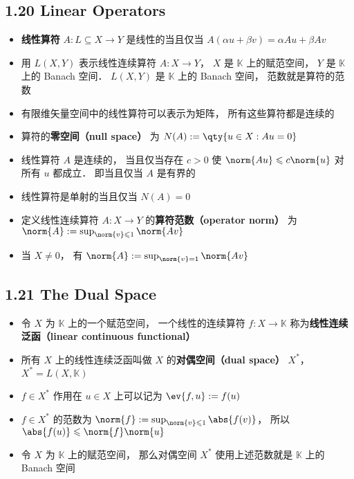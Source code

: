 \subsection{1.20 Linear Operators}
\begin{itemize}
\item \textbf{线性算符} $A: L \subseteq X\to Y$ 是线性的当且仅当 $A (\alpha u + \beta v) = \alpha Au + \beta Av$

\item 用 $L(X, Y)$ 表示线性连续算符 $A: X \to Y$， $X$ 是 $\mathbb K$ 上的赋范空间， $Y$ 是 $\mathbb K$ 上的 Banach 空间． $L(X, Y)$ 是 $\mathbb K$ 上的 Banach 空间， 范数就是算符的范数

\item 有限维矢量空间中的线性算符可以表示为矩阵， 所有这些算符都是连续的

\item 算符的\textbf{零空间（null space）} 为 $N(A) := \qty{u \in X: Au = 0}$

\item 线性算符 $A$ 是连续的， 当且仅当存在 $c > 0$ 使 $\norm{Au} \leqslant c\norm{u}$ 对所有 $u$ 都成立． 即当且仅当 $A$ 是有界的

\item 线性算符是单射的当且仅当 $N(A) = {0}$

\item 定义线性连续算符 $A: X \to Y$ 的\textbf{算符范数（operator norm）} 为 $\norm{A} := \sup_{\norm{v} \leqslant 1} \norm{A v}$

\item 当 $X \ne {0}$， 有 $\norm{A} := \sup_{\norm{v} = 1} \norm{A v}$
\end{itemize}

\subsection{1.21 The Dual Space}

\begin{itemize}
\item 令 $X$ 为 $\mathbb K$ 上的一个赋范空间， 一个线性的连续算符 $f: X \to \mathbb K$ 称为\textbf{线性连续泛函（linear continuous functional）}

\item 所有 $X$ 上的线性连续泛函叫做 $X$ 的\textbf{对偶空间（dual space）} $X^*$， $X^* = L(X, \mathbb K)$

\item $f \in X^*$ 作用在 $u \in X$ 上可以记为 $\ev{f, u} := f(u)$

\item $f\in X^*$ 的范数为 $\norm{f} := \sup_{\norm{v} \leqslant 1} \abs{f(v)}$， 所以 $\abs{f(u)} \leqslant \norm{f}\norm{u}$

\item 令 $X$ 为 $\mathbb K$ 上的赋范空间， 那么对偶空间 $X^*$ 使用上述范数就是 $\mathbb K$ 上的 Banach 空间
\end{itemize}

